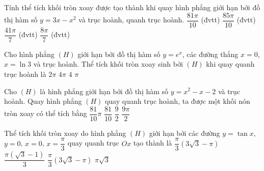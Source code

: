 \begin{ex}%
	Tính thể tích khối tròn xoay được tạo thành khi quay hình phẳng giới hạn bởi đồ thị hàm số $y=3x-x^2$ và  trục hoành, quanh trục hoành.
	\choice 
		{\True $\dfrac{81\pi}{10}$ (đvtt)} 
		 {$\dfrac{85\pi}{10}$ (đvtt)}
		 {$\dfrac{41\pi}{7}$ (đvtt)}
		 {$\dfrac{8\pi}{7}$ (đvtt)}
\end{ex}

\begin{ex}%
	Cho hình phẳng  $(H)$ giới hạn bởi đồ thị hàm số $y=e^x$, các đường thẳng $x=0$, $x=\ln 3$ và trục hoành. Thể tích khối tròn xoay sinh bởi $(H)$ khi quay quanh trục hoành là
	 \choice
		 {$2\pi$}
		{\True $4\pi$} 
		{$4$} 
		{$\pi$} 
	\loigiai{ 
		\[V=\pi \displaystyle\int_0^{\ln 3}e^{2x} \; \mathrm{d}x=\pi  \dfrac{1}{2} e^{2x}|_0^{\ln 3}=4\pi.\]
	 }
\end{ex}

\begin{ex}%
	Cho $(H)$ là hình phẳng giới hạn bởi đồ  thị hàm số $y=x^2-x-2$ và trục hoành. Quay hình phẳng $(H)$ quay quanh trục hoành, ta được một khối nón tròn xoay có thể tích bằng
	\choice 
		{\True $\dfrac{81}{10}  \pi$}
		{$\dfrac{81}{10}$} 
		 {$\dfrac{9}{2}$}
		{$\dfrac{9\pi}{2}$} 
\end{ex}

\begin{ex}%
	Thể tích khối tròn xoay do hình phẳng $(H)$ giới hạn bởi các đường $y=\tan x$, $y=0$, $x=0$, $x=\dfrac{\pi}{3}$ quay quanh  trục $Ox$ tạo thành là
	 \choice
		{\True  $\dfrac{\pi}{3}(3\sqrt{3}-\pi)$}
		 {$\dfrac{\pi(\sqrt{3}-1)}{3}$}
		{$\dfrac{\pi}{3}(3\sqrt{3}- \pi)$} 
		 {$\pi\sqrt{3}$}
\end{ex}

